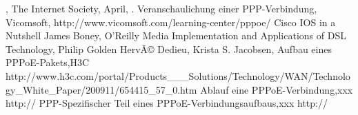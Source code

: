 \documentclass[journal]{IEEEtran}
\begin{document}
\begin{thebibliography}{1}
, \newblock The Internet Society, \newblock April, .
 Veranschaulichung einer PPP-Verbindung, \newblock Vicomsoft, \newblock http://www.vicomsoft.com/learning-center/pppoe/
 Cisco IOS in a Nutshell \newblock James Boney, \newblock O'Reilly Media 
 Implementation and Applications of DSL Technology, \newblock Philip Golden HervÃ© Dedieu, \newblock Krista S. Jacobsen, 
 Aufbau eines PPPoE-Pakets,\newblock H3C \newblock http://www.h3c.com/portal/Products\_\_\_Solutions/Technology/WAN/Technology\_White\_Paper/200911/654415\_57\_0.htm
 Ablauf eine PPPoE-Verbindung,\newblock xxx \newblock http://
 PPP-Spezifischer Teil eines PPPoE-Verbindungsaufbaus,\newblock xxx \newblock http://
\end{thebibliography} 
\end{document}
